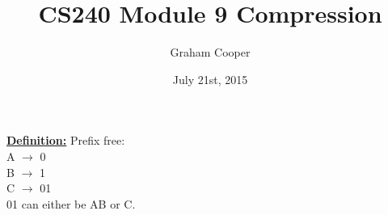 \documentclass[12pt]{article}
\title{\vspace{-15ex}CS240 Module 9 Compression\vspace{-1ex}}
\date{July 21st, 2015}
\author{Graham Cooper}
\newcommand{\myt}[1]{\textbf{\underline{#1}}}
\begin{document}
	\maketitle
	
	\myt{Definition:} Prefix free:\\
	A $\rightarrow$ 0\\
	B $\rightarrow$ 1\\
	C $\rightarrow$ 01\\
	
	01 can either be AB or C.\\
	
	
\end{document}
